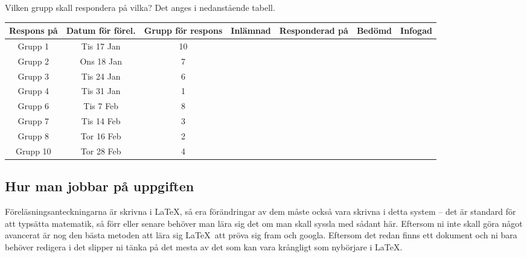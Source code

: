 \documentclass{tufte-handout}
\begin{document}
Vilken grupp skall respondera på vilka? Det anges i nedanstående tabell.

\begin{fullwidth}
	\begin{table}[h]
		\begin{tabularx}{0.78\pdfpagewidth}{ccccccc}
		Respons på & Datum för förel.  & Grupp för respons & Inlämnad & Responderad på & Bedömd & Infogad\\
		\midrule
		Grupp 1            & Tis 17 Jan & 10 & \checkmark & \checkmark & \checkmark &\\
		Grupp 2            & Ons 18 Jan & 7 & \checkmark & \checkmark & \checkmark &\\
		Grupp 3            & Tis 24 Jan & 6 & & & &\\
		Grupp 4            & Tis 31 Jan & 1 & & & &\\
		Grupp 6            & Tis 7 Feb & 8 & & & &\\
		Grupp 7            & Tis 14 Feb  & 3 & & & &\\
		Grupp 8            & Tor 16 Feb  & 2 & & & &\\
		Grupp 10           & Tor 28 Feb & 4 & & & &%
		\end{tabularx}
	\end{table}
\end{fullwidth}

\subsection{Hur man jobbar på uppgiften}

Föreläsningsanteckningarna är skrivna i \LaTeX, så era förändringar av dem måste också vara skrivna i detta system -- det är standard för att typsätta matematik, så förr eller senare behöver man lära sig det om man skall syssla med sådant här. Eftersom ni inte skall göra något avancerat är nog den bästa metoden att lära sig \LaTeX\ att pröva sig fram och googla. Eftersom det redan finns ett dokument och ni bara behöver redigera i det slipper ni tänka på det mesta av det som kan vara krångligt som nybörjare i \LaTeX.
\end{document}
